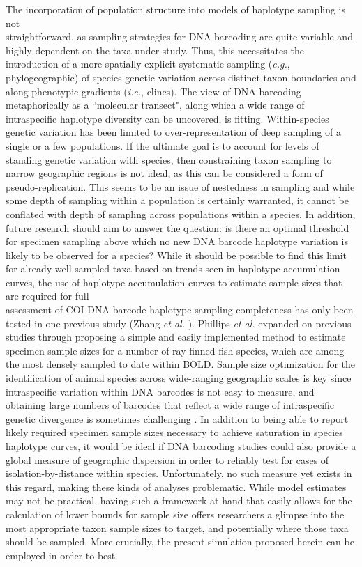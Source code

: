 \noindent The incorporation of population structure into models of haplotype sampling is not \\ straightforward, as sampling strategies for DNA barcoding are quite variable and highly dependent on the taxa under study. Thus, this necessitates the introduction of a more spatially-explicit systematic sampling (\textit{e.g.}, phylogeographic) of species genetic variation across distinct taxon boundaries and along phenotypic gradients (\textit{i.e.}, clines). The view of DNA barcoding metaphorically as a ``molecular transect", along which a wide range of intraspecific haplotype diversity can be uncovered, is fitting. Within-species genetic variation has been limited to over-representation of deep sampling of a single or a few populations. If the ultimate goal is to account for levels of standing genetic variation with species, then constraining taxon sampling to narrow geographic regions is not ideal, as this can be considered a form of pseudo-replication. This seems to be an issue of nestedness in sampling and while some depth of sampling within a population is certainly warranted, it cannot be conflated with depth of sampling across populations within a species. In addition, future research should aim to answer the question: is there an optimal threshold for specimen sampling above which no new DNA barcode haplotype variation is likely to be observed for a species? While it should be possible to find this limit for already well-sampled taxa based on trends seen in haplotype accumulation curves, the use of haplotype accumulation curves to estimate sample sizes that are required for full \\ assessment of COI DNA barcode haplotype sampling completeness has only been tested in one previous study (Zhang \textit{et al.} \cite{zhang2010estimating}). Phillips \textit{et al.} \cite{phillips2015exploration} expanded on previous studies through proposing a simple and easily implemented method to estimate specimen sample sizes for a number of ray-finned fish species, which are among the most densely sampled to date within BOLD. Sample size optimization for the identification of animal species across wide-ranging geographic scales is key since intraspecific variation within DNA barcodes is not easy to measure, and obtaining large numbers of barcodes that reflect a wide range of intraspecific genetic divergence is sometimes challenging \cite{bertolazzi2009learning}. In addition to being able to report likely required specimen sample sizes necessary to achieve saturation in species haplotype curves, it would be ideal if DNA barcoding studies could also provide a global measure of geographic dispersion in order to reliably test for cases of isolation-by-distance within species. Unfortunately, no such measure yet exists in this regard, making these kinds of analyses problematic. While model estimates may not be practical, having such a framework at hand that easily allows for the calculation of lower bounds for sample size offers researchers a glimpse into the most appropriate taxon sample sizes to target, and potentially where those taxa should be sampled. More crucially, the present simulation proposed herein can be employed in order to best 
